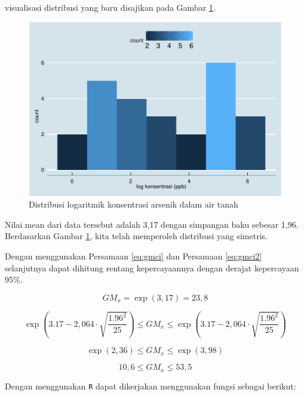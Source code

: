 \documentclass[]{book}
\begin{document}
visualisasi distribusi yang baru disajikan pada Gambar
\ref{fig:gwardatvis2}.

\begin{figure}

{\centering \includegraphics[width=0.7\linewidth]{EnvStat_files/figure-latex/gwardatvis2-1} 

}

\caption{Distribusi logaritmik konsentrasi arsenik dalam air tanah}\label{fig:gwardatvis2}
\end{figure}

Nilai mean dari data tersebut adalah 3,17 dengan simpangan baku sebesar
1,96. Berdasarkan Gambar \ref{fig:gwardatvis2}, kita telah memperoleh
distribusi yang simetris.

Dengan menggunakan Persamaan \eqref{eq:gmci} dan Persamaan \eqref{eq:gmci2}
selanjutnya dapat dihitung rentang kepercayaannya dengan derajat
kepercayaan 95\%.

\begin{equation}
  GM_x=\exp\left(3,17\right)=23,8
\end{equation}

\begin{equation}
  \exp\left(3.17-2,064\cdot\sqrt{\frac{1.96^2}{25}}\right)\le GM_x\le\exp\left(3.17-2,064\cdot\sqrt{\frac{1.96^2}{25}}\right)
\end{equation}

\begin{equation}
  \exp\left(2,36\right)\le GM_x\le\exp\left(3,98\right)
\end{equation}

\begin{equation}
  10,6\le GM_x\le53,5
\end{equation}

Dengan menggunakan \texttt{R} dapat dikerjakan menggunakan fungsi
sebagai berikut:
\end{document}
